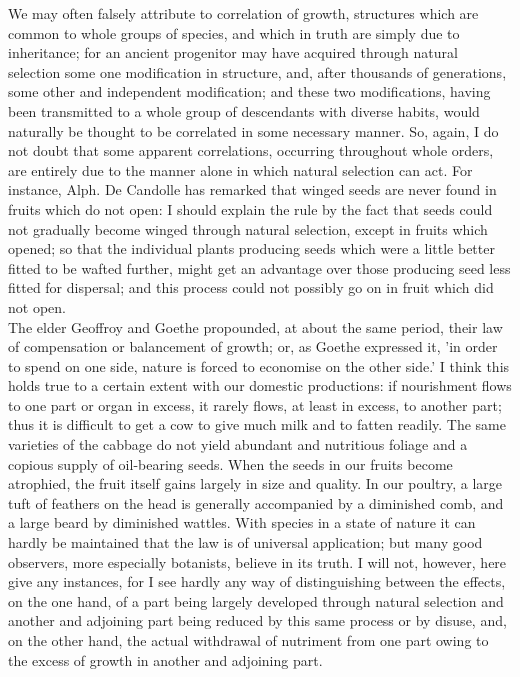 \indent We may often falsely attribute to correlation of growth, structures which are common to whole groups of species, and which in truth are simply due to inheritance; for an ancient progenitor may have acquired through natural selection some one modification in structure, and, after thousands of generations, some other and independent modification; and these two modifications, having been transmitted to a whole group of descendants with diverse habits, would naturally be thought to be correlated in some necessary manner. So, again, I do not doubt that some apparent correlations, occurring throughout whole orders, are entirely due to the manner alone in which natural selection can act. For instance, Alph. De Candolle has remarked that winged seeds are never found in fruits which do not open: I should explain the rule by the fact that seeds could not gradually become winged through natural selection, except in fruits which opened; so that the individual plants producing seeds which were a little better fitted to be wafted further, might get an advantage over those producing seed less fitted for dispersal; and this process could not possibly go on in fruit which did not open.\\
\indent The elder Geoffroy and Goethe propounded, at about the same period, their law of compensation or balancement of growth; or, as Goethe expressed it, 'in order to spend on one side, nature is forced to economise on the other side.' I think this holds true to a certain extent with our domestic productions: if nourishment flows to one part or organ in excess, it rarely flows, at least in excess, to another part; thus it is difficult to get a cow to give much milk and to fatten readily. The same varieties of the cabbage do not yield abundant and nutritious foliage and a copious supply of oil-bearing seeds. When the seeds in our fruits become atrophied, the fruit itself gains largely in size and quality. In our poultry, a large tuft of feathers on the head is generally accompanied by a diminished comb, and a large beard by diminished wattles. With species in a state of nature it can hardly be maintained that the law is of universal application; but many good observers, more especially botanists, believe in its truth. I will not, however, here give any instances, for I see hardly any way of distinguishing between the effects, on the one hand, of a part being largely developed through natural selection and another and adjoining part being reduced by this same process or by disuse, and, on the other hand, the actual withdrawal of nutriment from one part owing to the excess of growth in another and adjoining part.\\

